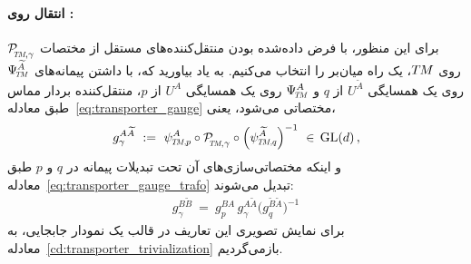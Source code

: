\paragraph{انتقال روی :}
برای این منظور، با فرض داده‌شده بودن منتقل‌کننده‌های مستقل از مختصات $\PTMgamma$ روی $T\mkern-1.5muM$، یک راه میان‌بر را انتخاب می‌کنیم.
به یاد بیاورید که، با داشتن پیمانه‌های $\PsiTM^{\widetilde{A}}$ روی یک همسایگی $U^{\widetilde{A}}$ از $q$ و $\PsiTM^A$ روی یک همسایگی $U^A$ از $p$، منتقل‌کننده بردار مماس طبق معادله~\eqref{eq:transporter_gauge} مختصاتی می‌شود، یعنی،
\begin{align}\label{eq:transporter_gauge_copy}
	g_\gamma^{A\widetilde{A}} \ :=\ \psiTMp^A \circ \PTMgamma \circ \Big( \psiTMq^{\widetilde{A}} \Big)^{-1} \ \in\, \GL{d} \,,
\end{align}
و اینکه مختصاتی‌سازی‌های آن تحت تبدیلات پیمانه در $q$ و $p$ طبق معادله~\eqref{eq:transporter_gauge_trafo} تبدیل می‌شوند:
\begin{align}\label{eq:transporter_gauge_trafo_copy}
	g_\gamma^{B\widetilde{B}} \ =\ g_p^{BA}\, g_\gamma^{A\widetilde{A}} \Big(g_q^{\widetilde{B}\widetilde{A}}\Big)^{-1}
\end{align}
برای نمایش تصویری این تعاریف در قالب یک نمودار جابجایی، به معادله~\eqref{cd:transporter_trivialization} بازمی‌گردیم.








